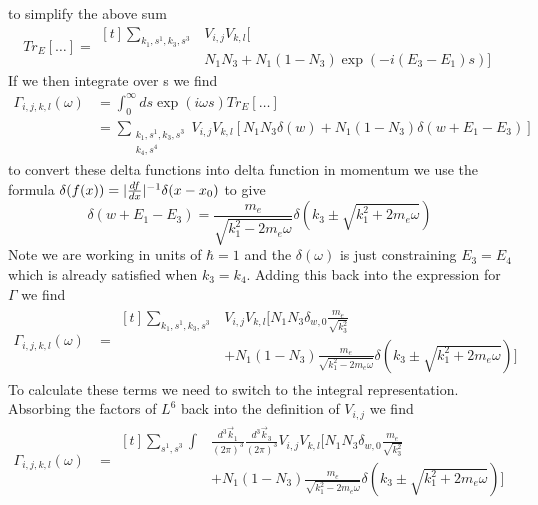 to simplify the above sum
\begin{equation}
    Tr_E[\dots] = \begin{aligned}[t]
        \sum_{k_1,s^1,k_3,s^3 }
         & V_{i,j} V_{k,l} [ \\
         & N_1 N_3
                + N_1 (1 - N_3) \exp{(-i(E_3 - E_1)s)}]
    \end{aligned}
\end{equation}
If we then integrate over s we find
\begin{align}
    \Gamma_{i,j, k,l}(\omega) & =
    \int_0^\infty{}{
        ds \exp{(i\omega{}s)} Tr_{E}[\dots]
    }                                \\
    {}                        & =
    \sum_{\substack{k_1,s^1, k_3,s^3 \\k_4,s^4 }}
    V_{i,j} V_{k,l} [
            N_1 N_3 \delta(w)
            + N_1 (1 - N_3)  \delta(w + E_1 -E_3) ]
\end{align}
to convert these delta functions
into delta function in momentum we
use the formula
\(\delta(f(x)) =
\lvert\frac{df}{dx}\rvert^{-1}\delta(x - x_0)\)
to give
\begin{equation}
    \delta(w + E_1 -E_3) =
    \frac{m_e}{\sqrt{k_1^2 - 2m_e\omega}}
    \delta({k_3 \pm \sqrt{k_1^2 + 2m_e\omega}})
\end{equation}
Note we are working in units of \(\hbar = 1\)
and the \(\delta(\omega)\) is just
constraining \(E_3 = E_4\) which is
already satisfied when \(k_3 = k_4\).
Adding this back into the expression
for \(\Gamma \) we find
\begin{align}
    \Gamma_{i,j, k,l}(\omega) & =\begin{aligned}[t]
        \sum_{k_1,s^1,k_3,s^3 }
         & V_{i,j} V_{k,l} [
        N_1 N_3 \delta_{w, 0} \frac{m_e}{\sqrt{k_3^2}} \\
         & + N_1 (1 - N_3)
                \frac{m_e}{\sqrt{k_1^2 - 2m_e\omega}}
                \delta({k_3 \pm \sqrt{k_1^2 + 2m_e\omega}}) ]
    \end{aligned}
\end{align}
To calculate these terms we
need to switch to the integral
representation. Absorbing the factors
of \(L^6\) back into the definition
of \(V_{i,j}\) we find
\begin{align}
    \Gamma_{i,j, k,l}(\omega) & =\begin{aligned}[t]
        \sum_{s^1,s^3} \int &
        \frac{d^3\vec{k}_1}{{(2\pi)}^3}
        \frac{d^3\vec{k}_3}{{(2\pi)}^3}
        V_{i,j} V_{k,l} [
        N_1 N_3 \delta_{w, 0} \frac{m_e}{\sqrt{k_3^2}} \\
                            & + N_1 (1 - N_3)
                \frac{m_e}{\sqrt{k_1^2 - 2m_e\omega}}
                \delta({k_3 \pm \sqrt{k_1^2 + 2m_e\omega}}) ]
    \end{aligned}
\end{align}
